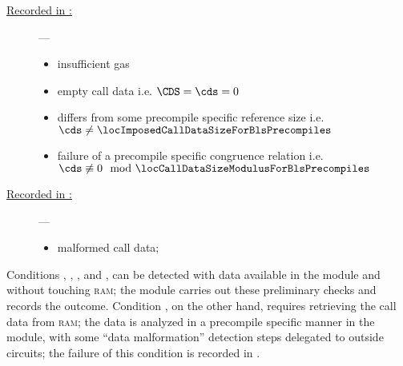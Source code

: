 \begin{description}
	\item[\underline{Recorded in \scenPrcFailureKnownToHub{}:}] ---
		\begin{itemize}
			\item
				\locBlsPrecompileFailureReasonGas{}
				insufficient gas
			\item
				\locBlsPrecompileFailureReasonEmpty{}
				empty call data i.e. $\CDS =\cds = 0$
			\item
				\locBlsPrecompileFailureReasonSize{}
				\cds{} differs from some precompile specific reference size i.e. $\cds \neq \locImposedCallDataSizeForBlsPrecompiles$
			\item
				\locBlsPrecompileFailureReasonMod{}
				failure of a precompile specific congruence relation i.e. $\cds \not \equiv 0 \mod \locCallDataSizeModulusForBlsPrecompiles$
		\end{itemize}
	\item[\underline{Recorded in \scenPrcFailureKnownToRam{}:}] ---
		\begin{itemize}
			\item
				\locBlsPrecompileFailureReasonData{}
				malformed call data;
		\end{itemize}
\end{description}
Conditions
\locBlsPrecompileFailureReasonGas,
\locBlsPrecompileFailureReasonEmpty,
\locBlsPrecompileFailureReasonSize, and
\locBlsPrecompileFailureReasonMod,
can be detected with data available in the \hubMod{} module and without touching \textsc{ram};
the \oobMod{} module carries out these preliminary checks and \scenPrcFailureKnownToHub{} records the outcome.
Condition
\locBlsPrecompileFailureReasonData,
on the other hand,
requires retrieving the call data from \textsc{ram};
the data is analyzed in a precompile specific manner in the \blsDataMod{} module,
with some ``data malformation'' detection steps delegated to outside circuits;
the failure of this condition is recorded in \scenPrcFailureKnownToRam{}.

